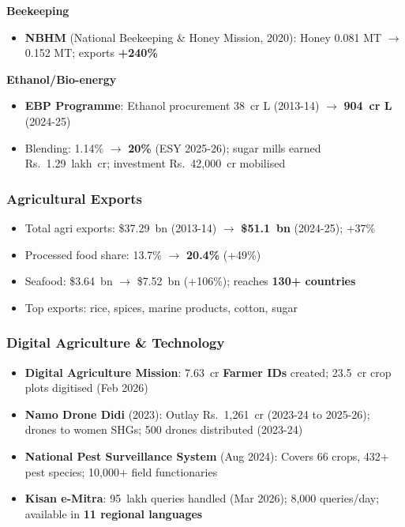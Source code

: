 \textbf{Beekeeping}
\begin{itemize}
  \item \textbf{NBHM} (National Beekeeping \& Honey Mission, 2020): Honey 0.081 MT $\to$ 0.152 MT; exports \textbf{+240\%}
\end{itemize}

\textbf{Ethanol/Bio-energy}
\begin{itemize}
  \item \textbf{EBP Programme}: Ethanol procurement 38~cr L (2013-14) $\to$ \textbf{904~cr L} (2024-25)
  \item Blending: 1.14\% $\to$ \textbf{20\%} (ESY 2025-26); sugar mills earned Rs.~1.29~lakh~cr; investment Rs.~42,000~cr mobilised
\end{itemize}

\subsubsection*{Agricultural Exports}
\begin{itemize}
  \item Total agri exports: \$37.29~bn (2013-14) $\to$ \textbf{\$51.1~bn} (2024-25); +37\%
  \item Processed food share: 13.7\% $\to$ \textbf{20.4\%} (+49\%)
  \item Seafood: \$3.64~bn $\to$ \$7.52~bn (+106\%); reaches \textbf{130+ countries}
  \item Top exports: rice, spices, marine products, cotton, sugar
\end{itemize}

\subsubsection*{Digital Agriculture \& Technology}
\begin{itemize}
  \item \textbf{Digital Agriculture Mission}: 7.63~cr \textbf{Farmer IDs} created; 23.5~cr crop plots digitised (Feb 2026)
  \item \textbf{Namo Drone Didi} (2023): Outlay Rs.~1,261~cr (2023-24 to 2025-26); drones to women SHGs; 500 drones distributed (2023-24)
  \item \textbf{National Pest Surveillance System} (Aug 2024): Covers 66 crops, 432+ pest species; 10,000+ field functionaries
  \item \textbf{Kisan e-Mitra}: 95~lakh queries handled (Mar 2026); 8,000 queries/day; available in \textbf{11 regional languages}
\end{itemize}

